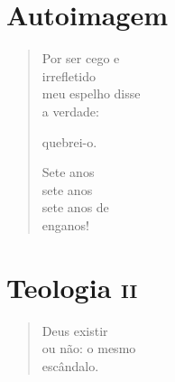\chapter{Autoimagem}

\begin{verse}
Por ser cego e\\
irrefletido\\
meu espelho disse\\
a verdade:

quebrei-o.

Sete anos\\
sete anos\\
sete anos de\\
enganos!
\end{verse}

\chapter{Teologia \textsc{ii}}

\begin{verse}
Deus existir\\
ou não: o mesmo\\
escândalo.
\end{verse}
